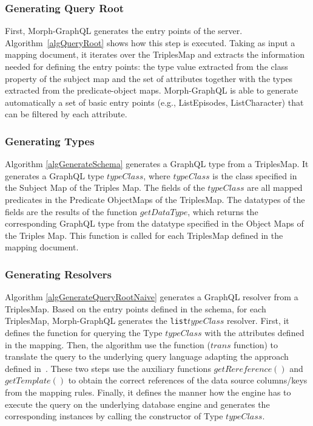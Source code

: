\subsubsection{Generating Query Root}
First, Morph-GraphQL generates the entry points of the server. Algorithm~\ref{algQueryRoot} shows how this step is executed. Taking as input a mapping document, it iterates over the TriplesMap and extracts the information needed for defining the entry points: the type value extracted from the class property of the subject map and the set of attributes together with the types extracted from the predicate-object maps. Morph-GraphQL is able to generate automatically a set of basic entry points (e.g., ListEpisodes, ListCharacter) that can be filtered by each attribute.


\subsubsection{Generating Types}
Algorithm \ref{algGenerateSchema} generates a GraphQL type from a TriplesMap. It generates a GraphQL type $typeClass$, where $typeClass$ is the class specified in the Subject Map of the Triples Map. The fields of the $typeClass$ are all mapped predicates in the Predicate ObjectMaps of the TriplesMap. The datatypes of the fields are the results of the function $getDataType$, which returns the corresponding GraphQL type from the datatype specified in the Object Maps of the Triples Map. This function is called for each TriplesMap defined in the mapping document.




\subsubsection{Generating Resolvers}
%



Algorithm \ref{algGenerateQueryRootNaive} generates a GraphQL resolver from a TriplesMap. Based on the entry points defined in the schema, for each TriplesMap, Morph-GraphQL generates the \texttt{list$typeClass$} resolver. First, it defines the function for querying the Type $typeClass$ with the attributes defined in the mapping. Then, the algorithm use the function ($trans$ function) to translate the query to the underlying query language adapting the approach defined in~\citep{chebotko2009semantics}. These two steps use the auxiliary functions $getRereference()$ and $getTemplate()$ to obtain the correct references of the data source columns/keys from the mapping rules. Finally, it defines the manner how the engine has to execute the query on the underlying database engine and generates the corresponding instances by calling the constructor of Type $typeClass$.


